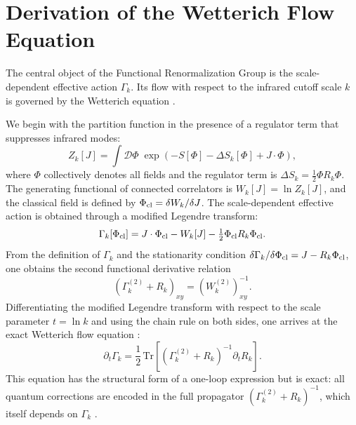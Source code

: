 \documentclass[12pt,a4paper]{article}
\begin{document}
\appendix

\section{Derivation of the Wetterich Flow Equation}
\label{app:wetterich}

The central object of the Functional Renormalization Group is the
scale-dependent effective action $\Gamma_k$. Its flow with respect to the
infrared cutoff scale $k$ is governed by the Wetterich equation \cite{Wetterich1993}.

We begin with the partition function in the presence of a regulator term that
suppresses infrared modes:
\begin{equation}
Z_k[J] =
\int \mathcal{D}\Phi \;\exp\!\left(
- S[\Phi] - \Delta S_k[\Phi] + J\cdot\Phi
\right),
\end{equation}
where $\Phi$ collectively denotes all fields and the regulator term is
$\Delta S_k = \tfrac{1}{2}\Phi R_k \Phi$. The generating functional of
connected correlators is $W_k[J] = \ln Z_k[J]$, and the classical field is
defined by $\Phi_{\rm cl} = \delta W_k/\delta J$. The scale-dependent effective
action is obtained through a modified Legendre transform:
\begin{equation}
\Gamma_k[\Phi_{\rm cl}]
= J\cdot\Phi_{\rm cl} - W_k[J] - \tfrac{1}{2}\Phi_{\rm cl} R_k \Phi_{\rm cl}.
\end{equation}
From the definition of $\Gamma_k$ and the stationarity condition
$\delta\Gamma_k/\delta\Phi_{\rm cl} = J - R_k\Phi_{\rm cl}$, one obtains
the second functional derivative relation
\begin{equation}
\left(\Gamma_k^{(2)} + R_k\right)_{xy}
= \left(W_k^{(2)}\right)_{xy}^{-1}.
\end{equation}
Differentiating the modified Legendre transform with respect to the scale
parameter $t = \ln k$ and using the chain rule on both sides, one arrives at
the exact Wetterich flow equation \cite{Wetterich1993,Berges2002}:
\begin{equation}
\partial_t \Gamma_k
=
\frac{1}{2}\,
\mathrm{Tr}
\left[
(\Gamma_k^{(2)} + R_k)^{-1}
\partial_t R_k
\right].
\end{equation}
This equation has the structural form of a one-loop expression but is exact:
all quantum corrections are encoded in the full propagator $(\Gamma_k^{(2)}
+ R_k)^{-1}$, which itself depends on $\Gamma_k$ \cite{Dupuis2021,Pawlowski2007}.
\end{document}
